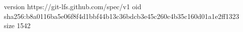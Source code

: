 version https://git-lfs.github.com/spec/v1
oid sha256:b8a0116ba5e06f8f4d1bbf44b13c36bdcb3e45c260c4b35c160d01a1e2ff1323
size 1542
